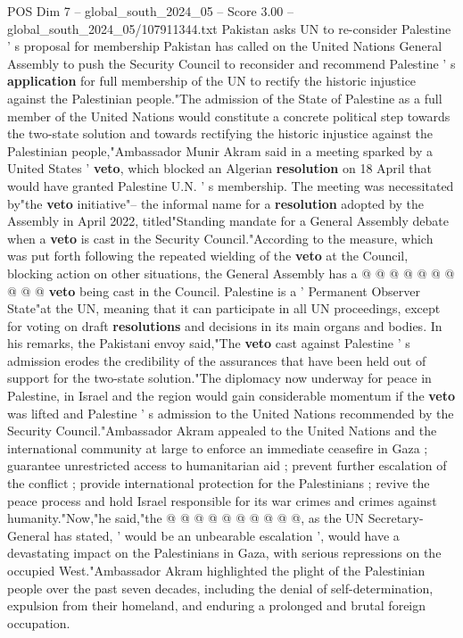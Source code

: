 \begin{textsample}{POS Dim 7 – global\_south\_2024\_05 – Score 3.00 – global\_south\_2024\_05/107911344.txt}  \label{ex:f7_pos_064}
Pakistan asks UN to re-consider Palestine ' s proposal for membership Pakistan has called on the United Nations General Assembly to push the Security Council to reconsider and recommend Palestine ' s \textbf{application} for full membership of the UN to rectify the historic injustice against the Palestinian people."The admission of the State of Palestine as a full member of the United Nations would constitute a concrete political step towards the two-state solution and towards rectifying the historic injustice against the Palestinian people,"Ambassador Munir Akram said in a meeting sparked by a United States ' \textbf{veto}, which blocked an Algerian \textbf{resolution} on 18 April that would have granted Palestine U.N. ' s membership.
The meeting was necessitated by"the \textbf{veto} initiative"-- the informal name for a \textbf{resolution} adopted by the Assembly in April 2022, titled"Standing mandate for a General Assembly debate when a \textbf{veto} is cast in the Security Council."According to the measure, which was put forth following the repeated wielding of the \textbf{veto} at the Council, blocking action on other situations, the General Assembly has a @ @ @ @ @ @ @ @ @ @ \textbf{veto} being cast in the Council.
Palestine is a ' Permanent Observer State"at the UN, meaning that it can participate in all UN proceedings, except for voting on draft \textbf{resolutions} and decisions in its main organs and bodies.
In his remarks, the Pakistani envoy said,"The \textbf{veto} cast against Palestine ' s admission erodes the credibility of the assurances that have been held out of support for the two-state solution."The diplomacy now underway for peace in Palestine, in Israel and the region would gain considerable momentum if the \textbf{veto} was lifted and Palestine ' s admission to the United Nations recommended by the Security Council."Ambassador Akram appealed to the United Nations and the international community at large to enforce an immediate ceasefire in Gaza ; guarantee unrestricted access to humanitarian aid ; prevent further escalation of the conflict ; provide international protection for the Palestinians ; revive the peace process and hold Israel responsible for its war crimes and crimes against humanity."Now,"he said,"the @ @ @ @ @ @ @ @ @ @, as the UN Secretary-General has stated, ' would be an unbearable escalation ', would have a devastating impact on the Palestinians in Gaza, with serious repressions on the occupied West."Ambassador Akram highlighted the plight of the Palestinian people over the past seven decades, including the denial of self-determination, expulsion from their homeland, and enduring a prolonged and brutal foreign occupation.

\end{textsample}
